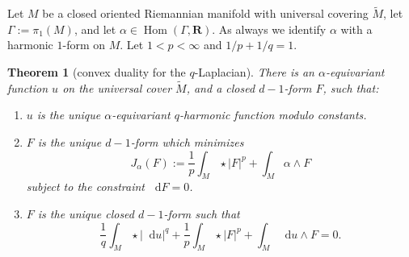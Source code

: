 \documentclass[reqno,11pt]{amsart}
\newcommand{\RR}{\mathbf{R}}
\newcommand*\dif{\mathop{}\!\mathrm{d}}
\DeclareMathOperator{\Hom}{Hom}
\newtheorem{theorem}{Theorem}[section]
\theoremstyle{definition}
\numberwithin{equation}{section}
\begin{document}
Let $M$ be a closed oriented Riemannian manifold with universal covering $\tilde M$, let $\Gamma := \pi_1(M)$, and let $\alpha \in \Hom(\Gamma, \RR)$.
As always we identify $\alpha$ with a harmonic $1$-form on $M$.
Let $1 < p < \infty$ and $1/p + 1/q = 1$.

\begin{theorem}[convex duality for the $q$-Laplacian]\label{mfmc qLaplacian}
There is an $\alpha$-equivariant function $u$ on the universal cover $\tilde M$, and a closed $d - 1$-form $F$, such that:
\begin{enumerate}
\item $u$ is the unique $\alpha$-equivariant $q$-harmonic function modulo constants.
\item $F$ is the unique $d - 1$-form which minimizes
$$J_\alpha(F) := \frac{1}{p} \int_M \star |F|^p + \int_M \alpha \wedge F$$
subject to the constraint $\dif F = 0$.
\item $F$ is the unique closed $d - 1$-form such that
\begin{equation}\label{strong duality appendix}
	\frac{1}{q} \int_M \star |\dif u|^q + \frac{1}{p} \int_M \star |F|^p + \int_M \dif u \wedge F = 0.
\end{equation}
\end{enumerate}
\end{theorem}
\end{document}
